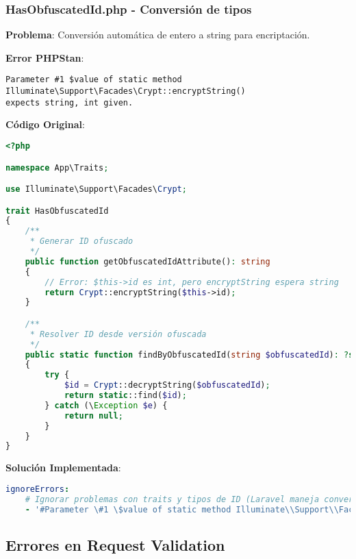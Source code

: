 \documentclass[12pt,a4paper]{article}
\begin{document}
\subsubsection{HasObfuscatedId.php - Conversión de tipos}

\textbf{Problema}: Conversión automática de entero a string para encriptación.

\textbf{Error PHPStan}:
\begin{lstlisting}[caption=Error en trait HasObfuscatedId]
Parameter #1 $value of static method Illuminate\Support\Facades\Crypt::encryptString()
expects string, int given.
\end{lstlisting}

\textbf{Código Original}:
\begin{lstlisting}[language=php, caption=HasObfuscatedId.php - Conversión de tipos]
<?php

namespace App\Traits;

use Illuminate\Support\Facades\Crypt;

trait HasObfuscatedId
{
    /**
     * Generar ID ofuscado
     */
    public function getObfuscatedIdAttribute(): string
    {
        // Error: $this->id es int, pero encryptString espera string
        return Crypt::encryptString($this->id);
    }

    /**
     * Resolver ID desde versión ofuscada
     */
    public static function findByObfuscatedId(string $obfuscatedId): ?self
    {
        try {
            $id = Crypt::decryptString($obfuscatedId);
            return static::find($id);
        } catch (\Exception $e) {
            return null;
        }
    }
}
\end{lstlisting}

\textbf{Solución Implementada}:
\begin{lstlisting}[language=yaml, caption=Ignorado para conversiones automáticas de Laravel]
ignoreErrors:
    # Ignorar problemas con traits y tipos de ID (Laravel maneja conversiones automáticamente)
    - '#Parameter \#1 \$value of static method Illuminate\\Support\\Facades\\Crypt::encryptString\(\) expects string, int given#'
\end{lstlisting}

\subsection{Errores en Request Validation}
\end{document}
